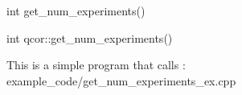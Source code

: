 
\begin{apidefinition}

\begin{Csynopsis}
    int get_num_experiments()
\end{Csynopsis}

\begin{Cppsynopsis}
    int qcor::get_num_experiments()
\end{Cppsynopsis}


\begin{apiarguments}
    \apiargument{}{}{}
\end{apiarguments}



\apinotes{
    
}

\begin{apiexamples}

\apicppexample
    { This is a simple program that calls : } 
    { example_code/get_num_experiments_ex.cpp} 
    {}

\end{apiexamples}

\end{apidefinition}
